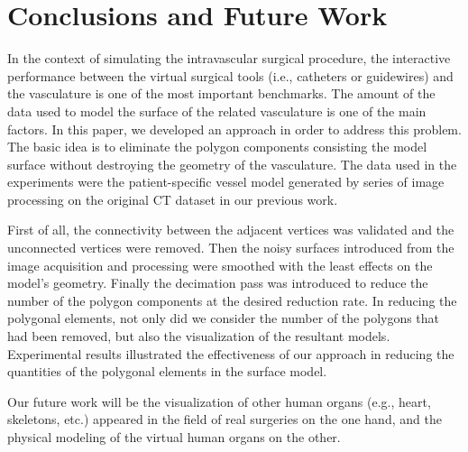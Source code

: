 
\section{Conclusions and Future Work}

In the context of simulating the intravascular surgical procedure, the interactive performance between the virtual surgical tools (i.e., catheters or guidewires) and the vasculature is one of the most important benchmarks. %
The amount of the data used to model the surface of the related vasculature is one of the main factors.
In this paper, we developed an approach in order to address this problem.
The basic idea is to eliminate the polygon components consisting the model surface without destroying the geometry of the vasculature.
The data used in the experiments were the patient-specific vessel model generated by series of image processing on the original CT dataset in our previous work.

First of all, the connectivity between the adjacent vertices was validated and the unconnected vertices were removed.
Then the noisy surfaces introduced from the image acquisition and processing were smoothed with the least effects on the model's geometry.
Finally the decimation pass was introduced to reduce the number of the polygon components at the desired reduction rate.
In reducing the polygonal elements, not only did we consider the number of the polygons that had been removed, but also the visualization of the resultant models.
Experimental results illustrated the effectiveness of our approach in reducing the quantities of the polygonal elements in the surface model.

Our future work will be the visualization of other human organs (e.g., heart, skeletons, etc.) appeared in the field of real surgeries on the one hand, and the physical modeling of the virtual human organs on the other. %
